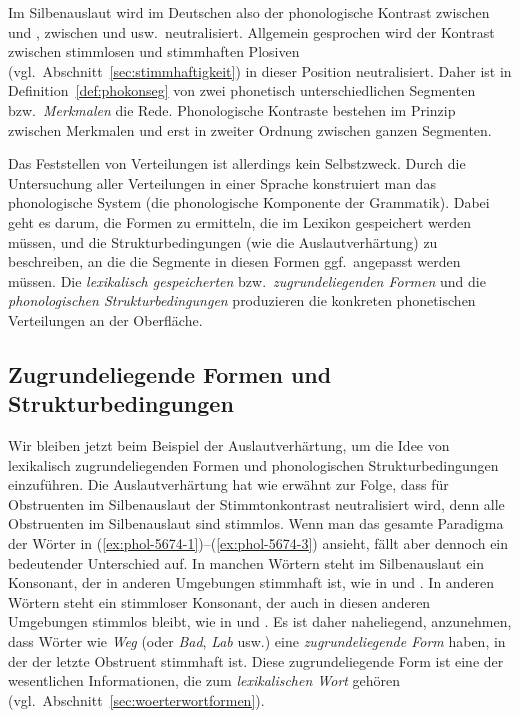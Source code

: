 
Im Silbenauslaut wird im Deutschen also der phonologische Kontrast zwischen \textipa{[g]} und \textipa{[k]}, zwischen \textipa{[d]} und \textipa{[t]} usw.\ neutralisiert.
Allgemein gesprochen wird der Kontrast zwischen stimmlosen und stimmhaften Plosiven (vgl.\ Abschnitt~\ref{sec:stimmhaftigkeit}) in dieser Position neutralisiert.
Daher ist in Definition~\ref{def:phokonseg} von zwei phonetisch unterschiedlichen Segmenten bzw.\ \textit{Merkmalen} die Rede.
Phonologische Kontraste bestehen im Prinzip zwischen Merkmalen und erst in zweiter Ordnung zwischen ganzen Segmenten.

Das Feststellen von Verteilungen ist allerdings kein Selbstzweck.
Durch die Untersuchung aller Verteilungen in einer Sprache konstruiert man das phonologische System (die phonologische Komponente der Grammatik).
Dabei geht es darum, die Formen zu ermitteln, die im Lexikon gespeichert werden müssen, und die Strukturbedingungen (wie die Auslautverhärtung) zu beschreiben, an die die Segmente in diesen Formen ggf.\ angepasst werden müssen.
Die \textit{lexikalisch gespeicherten} bzw.\ \textit{zugrundeliegenden Formen} und die \textit{phonologischen Strukturbedingungen} produzieren die konkreten phonetischen Verteilungen an der Oberfläche.

\subsection{Zugrundeliegende Formen und Strukturbedingungen}

\label{sec:zugrundeliegendeformenstrukturbedingungen}

Wir bleiben jetzt beim Beispiel der Auslautverhärtung, um die Idee von lexikalisch zugrundeliegenden Formen und phonologischen Strukturbedingungen einzuführen.
Die Auslautverhärtung hat wie erwähnt zur Folge, dass für Obstruenten im Silbenauslaut der Stimmtonkontrast neutralisiert wird, denn alle Obstruenten im Silbenauslaut sind stimmlos.
Wenn man das gesamte Paradigma der Wörter in (\ref{ex:phol-5674-1})--(\ref{ex:phol-5674-3}) ansieht, fällt aber dennoch ein bedeutender Unterschied auf.
In manchen Wörtern steht im Silbenauslaut ein Konsonant, der in anderen Umgebungen stimmhaft ist, wie in \textipa{[ve:k]} und \textipa{[ve:g@s]}.
In anderen Wörtern steht ein stimmloser Konsonant, der auch in diesen anderen Umgebungen stimmlos bleibt, wie in \textipa{[bOk]} und \textipa{[bOk@s]}.
Es ist daher naheliegend, anzunehmen, dass Wörter wie \textit{Weg} (oder \textit{Bad}, \textit{Lab} usw.) eine \textit{zugrundeliegende Form} haben, in der der letzte Obstruent stimmhaft ist.
Diese zugrundeliegende Form ist eine der wesentlichen Informationen, die zum \textit{lexikalischen Wort} gehören (vgl.\ Abschnitt~\ref{sec:woerterwortformen}).

